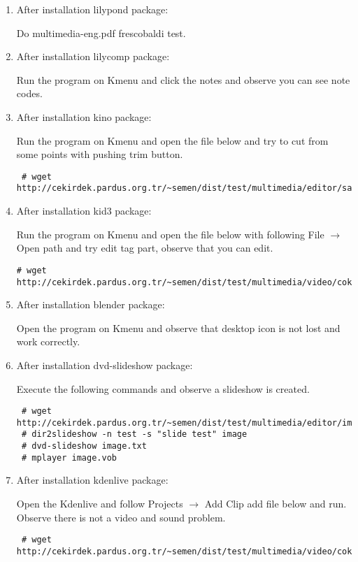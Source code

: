 \documentclass[a4paper,10pt]{article}
\begin{document}
\begin{enumerate}

\item After installation lilypond package:

  Do multimedia-eng.pdf frescobaldi test.

\item After installation lilycomp package:
   
 Run the program on Kmenu and click the notes and observe you can see note codes.

\item After installation kino package:

  Run the program on Kmenu and open the file below and try to cut from some points with pushing trim button.
\begin{verbatim}
 # wget http://cekirdek.pardus.org.tr/~semen/dist/test/multimedia/editor/sample.dv
\end{verbatim}


\item After installation kid3 package:

Run the program on Kmenu and open the file below with following File $\rightarrow$ Open path and try edit tag part, observe that you can edit.

\begin{verbatim}
# wget http://cekirdek.pardus.org.tr/~semen/dist/test/multimedia/video/cokluortam/linux.mp3 
\end{verbatim}
 
 \item After installation blender package:

  Open the program on Kmenu and observe that desktop icon is not lost and work correctly. 

 \item After installation dvd-slideshow package:

Execute the following commands and observe a slideshow is created.
\begin{verbatim}
 # wget http://cekirdek.pardus.org.tr/~semen/dist/test/multimedia/editor/image.tar.gz
 # dir2slideshow -n test -s "slide test" image
 # dvd-slideshow image.txt
 # mplayer image.vob 
\end{verbatim}
\item After installation kdenlive package:

Open the Kdenlive and follow Projects $\rightarrow$ Add Clip add file below and run. Observe there is not a video and sound problem.
\begin{verbatim}
 # wget http://cekirdek.pardus.org.tr/~semen/dist/test/multimedia/video/cokluortam/DVD.mpg
\end{verbatim}


\end{enumerate}
\end{document}
